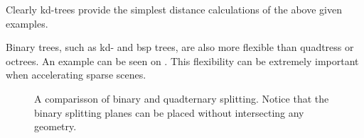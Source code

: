 Clearly kd-trees provide the simplest distance calculations of the
above given examples.


Binary trees, such as kd- and bsp trees, are also more flexible than
quadtress or octrees. An example can be seen on
. This flexibility can be extremely important
when accelerating sparse scenes.

\begin{figure}
  \centering
  \hspace{20pt}
  \caption[Comparisson of binary and quadternary splitting]{A
    comparisson of binary and quadternary splitting. Notice that the
    binary splitting planes can be placed without intersecting any
    geometry.}
  \label{fig:binQuadSplit}
\end{figure}


